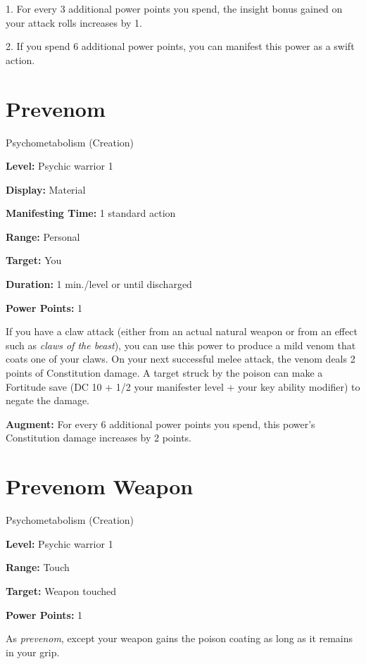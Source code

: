\documentclass{article}
\begin{document}
1. For every 3 additional power points you spend, the insight bonus gained on your 
attack rolls increases by 1. 

2. If you spend 6 additional power points, you can manifest this power as a swift 
action.

\vspace{12pt}
\section*{Prevenom}

Psychometabolism (Creation)

\textbf{Level:} Psychic warrior 1

\textbf{Display:} Material

\textbf{Manifesting Time:} 1 standard action

\textbf{Range:} Personal

\textbf{Target:} You

\textbf{Duration:} 1 min./level or until discharged

\textbf{Power Points:} 1

If you have a claw attack (either from an actual natural weapon or from an effect 
such as \textit{claws of the beast}), you can use this power to produce a mild 
venom that coats one of your claws. On your next successful melee attack, the venom 
deals 2 points of Constitution damage. A target struck by the poison can make a 
Fortitude save (DC 10 + 1/2 your manifester level + your key ability modifier) 
to negate the damage.

\textbf{Augment:} For every 6 additional power points you spend, this power's Constitution 
damage increases by 2 points.

\vspace{12pt}
\section*{Prevenom Weapon}

Psychometabolism (Creation)

\textbf{Level:} Psychic warrior 1

\textbf{Range:} Touch

\textbf{Target:} Weapon touched

\textbf{Power Points:} 1

As \textit{prevenom}, except your weapon gains the poison coating as long as it 
remains in your grip.

\vspace{12pt}
\end{document}
